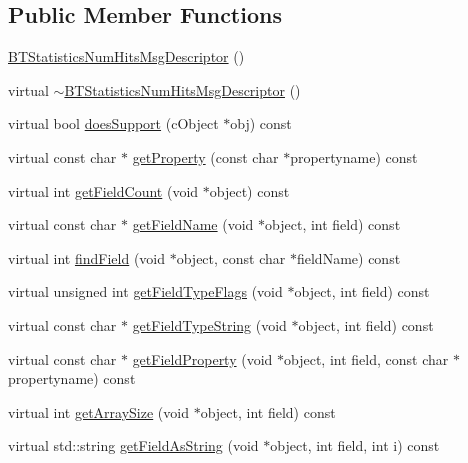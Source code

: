 \subsection*{Public Member Functions}
\begin{DoxyCompactItemize}
\item 
\hyperlink{classBTStatisticsNumHitsMsgDescriptor_a801f08a77eb9954909e19dc8343cf26c}{B\+T\+Statistics\+Num\+Hits\+Msg\+Descriptor} ()
\item 
virtual \hyperlink{classBTStatisticsNumHitsMsgDescriptor_acd98b9cd8b8706a00321b6f79347b9d6}{$\sim$\+B\+T\+Statistics\+Num\+Hits\+Msg\+Descriptor} ()
\item 
virtual bool \hyperlink{classBTStatisticsNumHitsMsgDescriptor_ad6dadb8660d3bd19273fed98303f9a64}{does\+Support} (c\+Object $\ast$obj) const 
\item 
virtual const char $\ast$ \hyperlink{classBTStatisticsNumHitsMsgDescriptor_a44db1a051fb2565d55c55c2c435cc2a9}{get\+Property} (const char $\ast$propertyname) const 
\item 
virtual int \hyperlink{classBTStatisticsNumHitsMsgDescriptor_a15aeb6bfee67dd9d9838ef087965df4e}{get\+Field\+Count} (void $\ast$object) const 
\item 
virtual const char $\ast$ \hyperlink{classBTStatisticsNumHitsMsgDescriptor_a0ae0e075cd578a55b74c3a2fed17764f}{get\+Field\+Name} (void $\ast$object, int field) const 
\item 
virtual int \hyperlink{classBTStatisticsNumHitsMsgDescriptor_a315fbfbfb1a7ee5380aa2693c04edf0e}{find\+Field} (void $\ast$object, const char $\ast$field\+Name) const 
\item 
virtual unsigned int \hyperlink{classBTStatisticsNumHitsMsgDescriptor_a6a538b7083a27dc960d4a4709e7d909c}{get\+Field\+Type\+Flags} (void $\ast$object, int field) const 
\item 
virtual const char $\ast$ \hyperlink{classBTStatisticsNumHitsMsgDescriptor_aa49fe4d07fd6fd60dd61611fb3858cbc}{get\+Field\+Type\+String} (void $\ast$object, int field) const 
\item 
virtual const char $\ast$ \hyperlink{classBTStatisticsNumHitsMsgDescriptor_af20b093c7bc6664100b9372ba6f81194}{get\+Field\+Property} (void $\ast$object, int field, const char $\ast$propertyname) const 
\item 
virtual int \hyperlink{classBTStatisticsNumHitsMsgDescriptor_a2941241ba1289d68a2e0b38368020d7f}{get\+Array\+Size} (void $\ast$object, int field) const 
\item 
virtual std\+::string \hyperlink{classBTStatisticsNumHitsMsgDescriptor_a5c0638a606f61bcb19cc896d891be9c4}{get\+Field\+As\+String} (void $\ast$object, int field, int i) const 

\end{DoxyCompactItemize}

